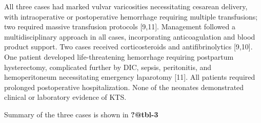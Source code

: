 \documentclass[
  letterpaper,
  DIV=11,
  numbers=noendperiod]{scrartcl}
\begin{document}
All three cases had marked vulvar varicosities necessitating cesarean
delivery, with intraoperative or postoperative hemorrhage requiring
multiple transfusions; two required massive transfusion protocols
{[}9,11{]}. Management followed a multidisciplinary approach in all
cases, incorporating anticoagulation and blood product support. Two
cases received corticosteroids and antifibrinolytics {[}9,10{]}. One
patient developed life-threatening hemorrhage requiring postpartum
hysterectomy, complicated further by DIC, sepsis, peritonitis, and
hemoperitoneum necessitating emergency laparotomy {[}11{]}. All patients
required prolonged postoperative hospitalization. None of the neonates
demonstrated clinical or laboratory evidence of KTS.

Summary of the three cases is shown in \textbf{?@tbl-3}
\end{document}
